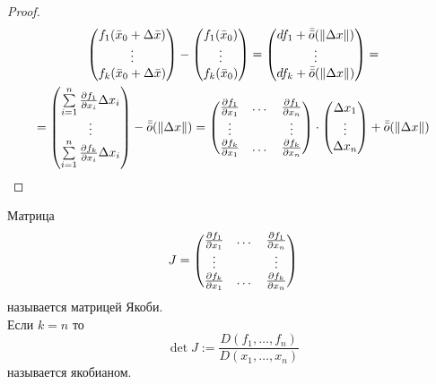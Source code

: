 \begin{proof}
    \begin{multline*}
        \begin{pmatrix}
            f_1(\bar{x}_0+\Delta \bar{x})\\
            \vdots\\
            f_k(\bar{x}_0+\Delta \bar{x})
        \end{pmatrix}
        -\begin{pmatrix}
            f_1(\bar{x}_0)\\
            \vdots\\
            f_k(\bar{x}_0)
        \end{pmatrix}
        =\begin{pmatrix}
            df_1+\bar{\bar{o}}{(\|\Delta x\|)}\\
            \vdots\\
            df_k+\bar{\bar{o}}{(\|\Delta x\|)}
        \end{pmatrix}=
        \\=\begin{pmatrix}
            \sum\limits_{i=1}^{n}\frac{\partial {f_1}}{\partial {x_i}}\Delta x_i\\
            \vdots\\
            \sum\limits_{i=1}^{n}\frac{\partial {f_k}}{\partial {x_i}}\Delta x_i
        \end{pmatrix}-\bar{\bar{o}}{(\|\Delta x\|)}=
        \begin{pmatrix}
            \frac{\partial {f_1}}{\partial {x_1}} & \dots & \frac{\partial {f_1}}{\partial {x_n}}\\
            \vdots & \null & \vdots\\
            \frac{\partial {f_k}}{\partial {x_1}} & \dots & \frac{\partial {f_k}}{\partial {x_n}}
        \end{pmatrix}
        \cdot 
        \begin{pmatrix}
            \Delta x_1\\
            \vdots\\
            \Delta x_n
        \end{pmatrix}    
        +\bar{\bar{o}}{(\|\Delta x\|)}    
    \end{multline*} 
\end{proof} 
    \begin{definition}
        Матрица
        \[J=\begin{pmatrix}
            \frac{\partial {f_1}}{\partial {x_1}} & \dots & \frac{\partial {f_1}}{\partial {x_n}}\\
            \vdots & \null & \vdots\\
            \frac{\partial {f_k}}{\partial {x_1}} & \dots & \frac{\partial {f_k}}{\partial {x_n}}
        \end{pmatrix}\]
        называется матрицей Якоби.\\
        Если $k=n$ то 
        \[\det{J}:=\frac{D(f_1,\dots,f_n)}{D(x_1,\dots,x_n)}\]
        называется якобианом.
    \end{definition} 
